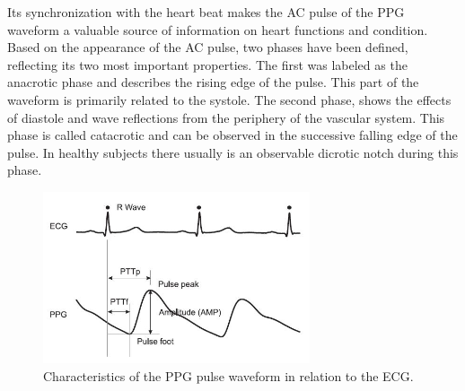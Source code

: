 Its synchronization with the heart beat makes the AC pulse of the PPG waveform a valuable source of information on heart functions and condition. Based on the appearance of the AC pulse, two phases have been defined, reflecting its two most important properties. The first was labeled as the anacrotic phase and describes the rising edge of the pulse. This part of the waveform is primarily related to the systole. The second phase, shows the effects of diastole and wave reflections from the periphery of the vascular system. This phase is called catacrotic and can be observed in the successive falling edge of the pulse. In healthy subjects there usually is an observable dicrotic notch during this phase.
\begin{figure}[ht]
	\centering
  \includegraphics[width=0.7\textwidth, angle=0]{images/ppg_pw.jpg}
	\caption[PPG pulse characteristics]{Characteristics of the PPG pulse waveform in relation to the ECG.}
	\label{ppg_pw}
\end{figure}

